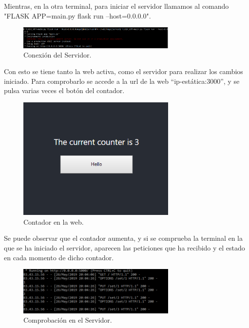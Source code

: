 \documentclass[english,runningheads,a4paper]{llncs}[2018/03/10]
\begin{document}
Mientras, en la otra terminal, para iniciar el servidor llamamos al comando "FLASK APP=main.py flask run –host=0.0.0.0".

\begin{figure}[h!]
 \centering
 \includegraphics[width=0.7\textwidth]{./Web/Azure/ConexionServer.png}
 \caption{Conexión del Servidor.}
\end{figure}

Con esto se tiene tanto la web activa, como el servidor para realizar los cambios
iniciado. Para comprobarlo se accede a la url de la web “ip-estática:3000”, y se
pulsa varias veces el botón del contador.

\begin{figure}[h!]
 \centering
 \includegraphics[width=0.7\textwidth]{./Web/Azure/Contador.png}
 \caption{Contador en la web.}
\end{figure}

Se puede observar que el contador aumenta, y si se comprueba la terminal en la que
se ha iniciado el servidor, aparecen las peticiones que ha recibido y el estado en
cada momento de dicho contador.

\begin{figure}[h!]
 \centering 
 \includegraphics[width=0.7\textwidth]{./Web/Azure/Comprobacion.png}
 \caption{Comprobación en el Servidor.}
\end{figure}
\end{document}
